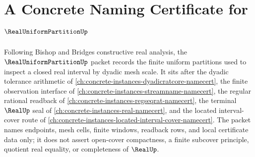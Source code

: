 \chapter{A Concrete Naming Certificate for $\RealUniformPartitionUp$}
\label{ch:concrete-instances-real-uniform-partition-namecert}

Following Bishop and Bridges constructive real analysis, the $\RealUniformPartitionUp$ packet records the finite uniform partitions used to inspect a closed real interval by dyadic mesh scale. It sits after the dyadic tolerance arithmetic of \autoref{ch:concrete-instances-dyadicratcore-namecert}, the finite observation interface of \autoref{ch:concrete-instances-streamname-namecert}, the regular rational readback of \autoref{ch:concrete-instances-regseqrat-namecert}, the terminal $\RealUp$ seal of \autoref{ch:concrete-instances-real-namecert}, and the located interval-cover route of \autoref{ch:concrete-instances-located-interval-cover-namecert}. The packet names endpoints, mesh cells, finite windows, readback rows, and local certificate data only; it does not assert open-cover compactness, a finite subcover principle, quotient real equality, or completeness of $\RealUp$.

